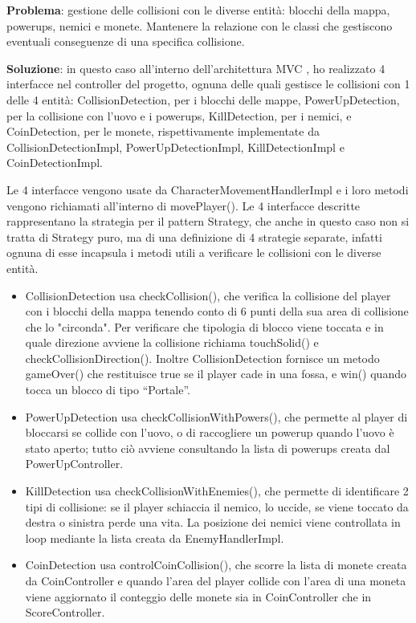 \documentclass[a4paper,12pt]{report}
\begin{document}
\textbf{Problema}: gestione delle collisioni con le diverse entità: blocchi della mappa, powerups, nemici e monete. 
Mantenere la relazione con le classi che gestiscono eventuali conseguenze di una specifica collisione.

\textbf{Soluzione}: in questo caso all'interno dell'architettura MVC , ho realizzato 4 interfacce nel controller del progetto, 
ognuna delle quali gestisce le collisioni con 1 delle 4 entità: CollisionDetection, per i blocchi delle mappe, PowerUpDetection, 
per la collisione con l'uovo e i powerups, KillDetection, per i nemici, e CoinDetection, per le monete, 
rispettivamente implementate da CollisionDetectionImpl, PowerUpDetectionImpl, KillDetectionImpl e CoinDetectionImpl.

Le 4 interfacce vengono usate da CharacterMovementHandlerImpl e i loro metodi vengono richiamati all'interno di movePlayer().
Le 4 interfacce descritte rappresentano la strategia per il pattern Strategy, che anche in questo caso non si tratta di Strategy puro, 
ma di una definizione di 4 strategie separate, infatti ognuna di esse incapsula i metodi utili a verificare le collisioni con le 
diverse entità.

\begin{itemize}
    \item CollisionDetection usa checkCollision(), che verifica la collisione del player con i blocchi della mappa tenendo conto di 6 punti 
    della sua area di collisione che lo "circonda". Per verificare che tipologia di blocco viene toccata e in quale direzione avviene
    la collisione richiama touchSolid() e checkCollisionDirection().
    Inoltre CollisionDetection fornisce un metodo gameOver() che restituisce true se il player cade in una fossa, e win() quando 
    tocca un blocco di tipo “Portale”.
    \item PowerUpDetection usa checkCollisionWithPowers(), che permette al player di bloccarsi se collide con l'uovo, o di raccogliere un 
    powerup quando l'uovo è stato aperto; tutto ciò avviene consultando la lista di powerups creata dal PowerUpController.
    \item KillDetection usa checkCollisionWithEnemies(), che permette di identificare 2 tipi di collisione: se il player schiaccia il nemico, 
    lo uccide, se viene toccato da destra o sinistra perde una vita. La posizione dei nemici viene controllata in loop mediante 
    la lista creata da EnemyHandlerImpl.
    \item CoinDetection usa controlCoinCollision(), che scorre la lista di monete creata da CoinController e quando l'area del player collide 
    con l'area di una moneta viene aggiornato il conteggio delle monete sia in CoinController che in ScoreController.
\end{itemize}
\end{document}
